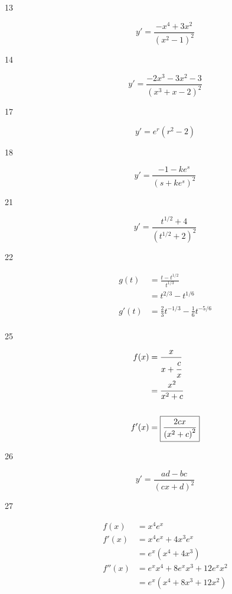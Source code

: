 \documentclass[letterpaper, landscape]{exam}
\begin{document}
\begin{description}
    \item[13] 
      \[
        y' = \boxed{ \frac{ -x^4 + 3x^2 }{\left( x^2 - 1 \right)^2} }
      \]
      
    \item[14] 
      \[
        y' = \boxed{ \frac{-2x^3 - 3x^2 - 3}{\left( x^3 + x - 2 \right)^2} }
      \]
      
      

    \item[17] 
      \[
        y' = \boxed{ e^r \left( r^2 - 2 \right) }
      \]

    \item[18] 
      \[
        y' = \boxed{ \frac{-1 - k e^s}{\left( s + k e^s \right)^2} }
      \]

    \item[21] 
      \[
        y' = \boxed{ \frac{t^{1/2} + 4}{\left( t^{1/2} + 2 \right)^2} }
      \]

    \item[22] 
      \begin{align*}
        g(t)  & = \frac{t - t^{1/2}}{t^{1/3}} \\
              & = t^{2/3} - t^{1/6} \\
        \\
        g'(t) & = \boxed{ \frac{2}{3} t^{-1/3} - \frac{1}{6} t^{-5/6} } \\
      \end{align*}

    \item[25] 
      \begin{align*}
        f(x)  & = \frac{x}{x + \cfrac{c}{x} } \\
              & = \frac{x^2}{x^2 + c} \\
        \\
        f'(x) & = \boxed{ \frac{2 c x}{\left( x^2 + c \right)^2} }
      \end{align*}

    \item[26] 
      \[
        y' = \boxed{ \frac{a d - b c}{(c x + d)^2} }
      \]

    \item[27]
      \begin{align*}
        f(x)   & = x^4 e^x \\
        f'(x)  & = x^4 e^x + 4x^3 e^x \\
               & = \boxed{ e^x \left( x^4 + 4x^3 \right) } \\
        f''(x) & = e^x x^4 + 8 e^x x^3 + 12 e^x x^2 \\
               & = \boxed{ e^x \left( x^4 + 8 x^3 + 12 x^2  \right) } \\
      \end{align*}


\end{description}
\end{document}
